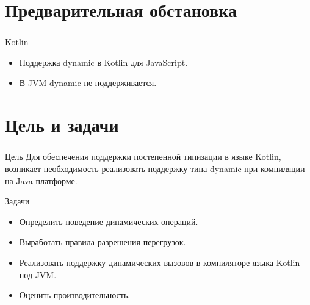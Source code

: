 \documentclass[t]{beamer}  %
\begin{document}
\section{Предварительная обстановка}
\begin{frame}
	\frametitle{\insertsection} 
    \begin{block}{Kotlin}
		\begin{itemize}
          \item Поддержка dynamic в Kotlin для JavaScript.
          \item В JVM dynamic не поддерживается.
		\end{itemize}
	\end{block}

\end{frame}


\section{Цель и задачи}
\begin{frame}
	\frametitle{\insertsection} 
    \begin{block}{Цель}
			Для обеспечения поддержки постепенной типизации в языке Kotlin, возникает
необходимость реализовать поддержку типа dynamic при компиляции на Java платформе.
	\end{block}
    \begin{block}{Задачи}
		\begin{itemize}
          \item Определить поведение динамических операций.
          \item Выработать правила разрешения перегрузок.
          \item Реализовать поддержку динамических вызовов в компиляторе языка Kotlin под
JVM.
          \item  Оценить производительность.
		\end{itemize}
	\end{block}

\end{frame}
\end{document}
